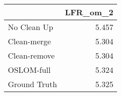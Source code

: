 \begin{tabular}{lr}
\toprule
{} & LFR_om_2 \\
\midrule
No Clean Up  &    5.457 \\
Clean-merge  &    5.304 \\
Clean-remove &    5.304 \\
OSLOM-full   &    5.324 \\
Ground Truth &    5.325 \\
\bottomrule
\end{tabular}
